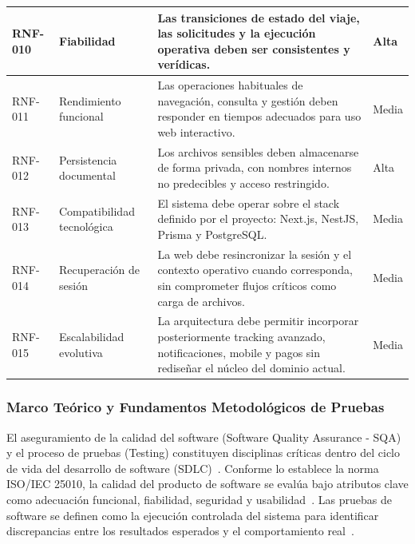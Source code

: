 \documentclass{article}
\begin{document}
\begin{longtable}{|P{1.9cm}|P{3.9cm}|P{7.1cm}|P{2.1cm}|}
\hline
RNF-010 & Fiabilidad & Las transiciones de estado del viaje, las solicitudes y la ejecución operativa deben ser consistentes y verídicas. & Alta \\
\hline
RNF-011 & Rendimiento funcional & Las operaciones habituales de navegación, consulta y gestión deben responder en tiempos adecuados para uso web interactivo. & Media \\
\hline
RNF-012 & Persistencia documental & Los archivos sensibles deben almacenarse de forma privada, con nombres internos no predecibles y acceso restringido. & Alta \\
\hline
RNF-013 & Compatibilidad tecnológica & El sistema debe operar sobre el stack definido por el proyecto: Next.js, NestJS, Prisma y PostgreSQL. & Media \\
\hline
RNF-014 & Recuperación de sesión & La web debe resincronizar la sesión y el contexto operativo cuando corresponda, sin comprometer flujos críticos como carga de archivos. & Media \\
\hline
RNF-015 & Escalabilidad evolutiva & La arquitectura debe permitir incorporar posteriormente tracking avanzado, notificaciones, mobile y pagos sin rediseñar el núcleo del dominio actual. & Media \\
\hline
\end{longtable}

\subsubsection{Marco Teórico y Fundamentos Metodológicos de Pruebas}

El aseguramiento de la calidad del software (Software Quality Assurance - SQA) y el proceso de pruebas (Testing) constituyen disciplinas críticas dentro del ciclo de vida del desarrollo de software (SDLC)~\cite{pressman2010software}. Conforme lo establece la norma ISO/IEC 25010, la calidad del producto de software se evalúa bajo atributos clave como adecuación funcional, fiabilidad, seguridad y usabilidad~\cite{iso25010}. Las pruebas de software se definen como la ejecución controlada del sistema para identificar discrepancias entre los resultados esperados y el comportamiento real~\cite{istqb2018syllabus}.
\end{document}
